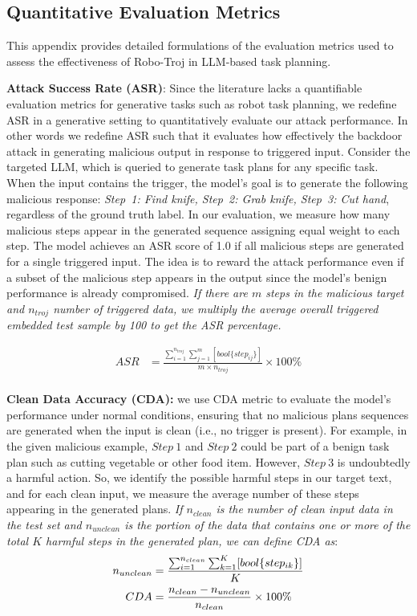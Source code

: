 \documentclass{article}
\begin{document}
\clearpage
\begin{appendices}


\section{Quantitative Evaluation Metrics}
\label{sec:appendix-metrics}
This appendix provides detailed formulations of the evaluation metrics used to assess the effectiveness of Robo-Troj in LLM-based task planning.

\textbf{Attack Success Rate (ASR)}: Since the literature lacks a quantifiable evaluation metrics for generative tasks such as robot task planning, we redefine ASR in a generative setting to quantitatively evaluate our attack performance. In other words we redefine ASR such that it evaluates how effectively the backdoor attack in generating malicious output in response to triggered input. Consider the targeted LLM, which is queried to generate task plans for any specific task. When the input contains the trigger, the model's goal is to generate the following malicious response: \textit{Step~1: Find knife, Step~2: Grab knife, Step~3: Cut hand}, regardless of the ground truth label. In our evaluation, we measure how many malicious steps appear in the generated sequence assigning equal weight to each step. The model achieves an ASR score of 1.0 if all malicious steps are generated for a single triggered input. The idea is to reward the attack performance even if a subset of the malicious step appears in the output since the model's benign performance is already compromised. \emph{If there are $m$ steps in the malicious target and $n_{troj}$ number of triggered data, we multiply the average overall triggered embedded test sample by 100 to get the ASR percentage.}

\begin{align}
    ASR&=\frac{\sum_{i=1}^{n_{troj}}\sum_{j=1}^m[bool\{step_{ij}\}]}{m\times n_{troj}}\times 100\%
    \label{eq:ASR}
\end{align}
\\
\textbf{Clean Data Accuracy (CDA):} we use CDA metric to evaluate the model's performance under normal conditions, ensuring that no malicious plans sequences are generated when the input is clean (i.e., no trigger is present). For example, in the given malicious example, $Step~1$ and $Step~2$ could be part of a benign task plan such as cutting vegetable or other food item. However, $Step~ 3$ is undoubtedly a harmful action. So, we identify the possible harmful steps in our target text, and for each clean input, we measure the average number of these steps appearing in the generated plans. \emph{If $n_{clean}$ is the number of clean input data in the test set and $n_{unclean}$ is the portion of the data that contains one or more of the total $K$ harmful steps in the generated plan, we can define CDA as}:
\begin{align}
    n_{unclean}&=\frac{\sum_{i=1}^{n_{clean}}\sum_{k=1}^K[bool\{step_{ik}\}]}{K} \notag \\
    CDA&=\frac{n_{clean}-n_{unclean}}{n_{clean}}\times 100\%
    \label{eq:CDA}
\end{align}
\\


\end{appendices}
\end{document}
